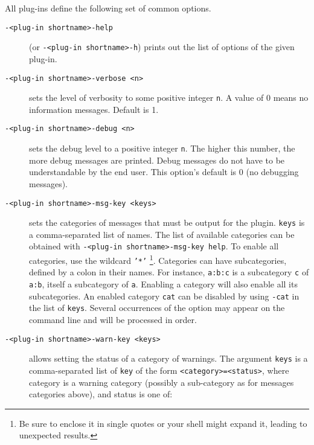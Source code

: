 All \FramaC plug-ins define the following set of common options.
\begin{description}
\item[\texttt{-<plug-in shortname>-help}] (or \texttt{-<plug-in shortname>-h})
  prints out the list of options of the given plug-in.

\item[\texttt{-<plug-in shortname>-verbose <n>}]
 sets the level of verbosity to
  some positive integer \texttt{n}. A value of 0 means no information
  messages. Default is 1.

\item[\texttt{-<plug-in shortname>-debug <n>}]
  sets the debug level to a
  positive integer \texttt{n}. The higher this number, the more debug messages
  are printed. Debug messages do not have to be understandable by the end
  user. This option's default is 0 (no debugging messages).
\item[\texttt{-<plug-in shortname>-msg-key <keys>}]
  sets the categories of
  messages that must be output for the plugin. \texttt{keys} is a
  comma-separated list of names. The list of available categories can be
  obtained with \texttt{-<plug-in shortname>-msg-key help}. To enable all
  categories, use the wildcard \texttt{'*'}%
  \footnote{Be sure to enclose it in single quotes or your shell might
    expand it, leading to unexpected results.}. Categories can have
  subcategories, defined by a colon in their names. For instance, \texttt{a:b:c}
  is a subcategory \texttt{c} of \texttt{a:b}, itself a
  subcategory of \texttt{a}. Enabling a category will also enable all its
  subcategories. An enabled category \texttt{cat} can be disabled by using
  \texttt{-cat} in the list of \texttt{keys}. Several occurrences of the option
  may appear on the command line and will be processed in order.
\item[\texttt{-<plug-in shortname>-warn-key <keys>}]
allows setting the status of a category of warnings. The argument \texttt{keys} is a comma-separated
list of \texttt{key} of the form \texttt{<category>=<status>}, where category is a warning
category (possibly a sub-category as for messages categories above), and status is one of:

\end{description}
